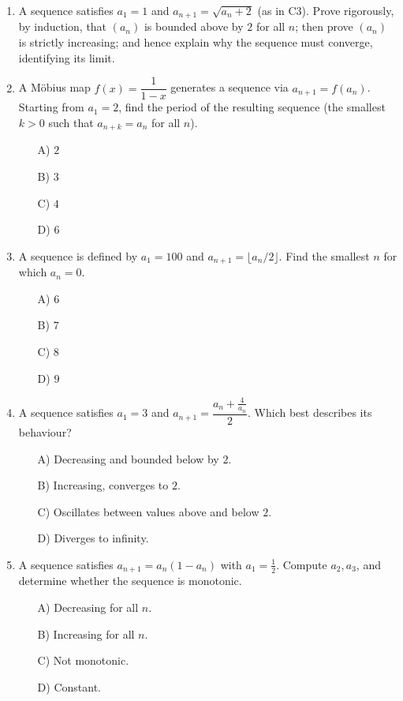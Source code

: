 \documentclass[11pt,a4paper]{article}
\begin{document}
\begin{enumerate}

\item A sequence satisfies $a_1=1$ and $a_{n+1}=\sqrt{a_n+2}$ (as in C3). Prove rigorously, by induction, that $(a_n)$ is bounded above by $2$ for all $n$; then prove $(a_n)$ is strictly increasing; and hence explain why the sequence must converge, identifying its limit.

\item A M\"obius map $f(x)=\dfrac1{1-x}$ generates a sequence via $a_{n+1}=f(a_n)$. Starting from $a_1=2$, find the period of the resulting sequence (the smallest $k>0$ such that $a_{n+k}=a_n$ for all $n$).
\begin{itemize}
\item[A)] $2$
\item[B)] $3$
\item[C)] $4$
\item[D)] $6$
\end{itemize}

\item A sequence is defined by $a_1=100$ and $a_{n+1}=\lfloor a_n/2\rfloor$. Find the smallest $n$ for which $a_n=0$.
\begin{itemize}
\item[A)] $6$
\item[B)] $7$
\item[C)] $8$
\item[D)] $9$
\end{itemize}

\item A sequence satisfies $a_1=3$ and $a_{n+1}=\dfrac{a_n+\frac4{a_n}}2$. Which best describes its behaviour?
\begin{itemize}
\item[A)] Decreasing and bounded below by $2$.
\item[B)] Increasing, converges to $2$.
\item[C)] Oscillates between values above and below $2$.
\item[D)] Diverges to infinity.
\end{itemize}

\item A sequence satisfies $a_{n+1}=a_n(1-a_n)$ with $a_1=\tfrac12$. Compute $a_2,a_3$, and determine whether the sequence is monotonic.
\begin{itemize}
\item[A)] Decreasing for all $n$.
\item[B)] Increasing for all $n$.
\item[C)] Not monotonic.
\item[D)] Constant.
\end{itemize}

\end{enumerate}

\end{document}
